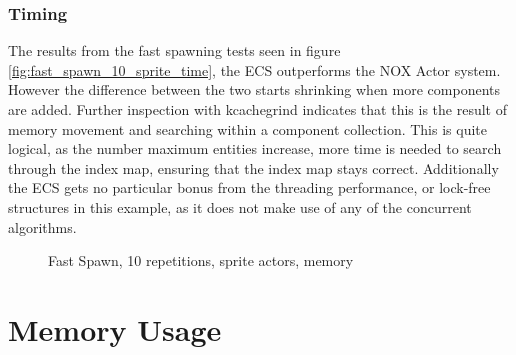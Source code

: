 \subsubsection{Timing}
The results from the fast spawning tests seen in figure \ref{fig:fast_spawn_10_sprite_time},
the ECS outperforms the NOX Actor system.
However the difference between the two starts shrinking when more components are added.
Further inspection with kcachegrind indicates that this is the result of memory movement and searching within a component collection.
This is quite logical, as the number maximum entities increase, more time is needed
to search through the index map, ensuring that the index map stays correct.
Additionally the ECS gets no particular bonus from the threading performance, or lock-free structures
in this example, as it does not make use of any of the concurrent algorithms.
\begin{figure}[H]
\centering
{}
\caption{Fast Spawn, 10 repetitions, sprite actors, memory}
\label{fig:fast_spawn_10_sprite_peak_memory}
\end{figure}

\section{Memory Usage}
